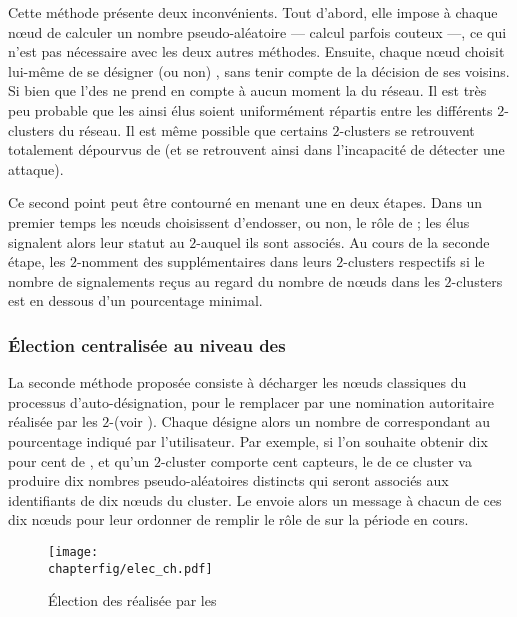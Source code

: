 Cette méthode présente deux inconvénients.
Tout d'abord, elle impose à chaque nœud de calculer un nombre pseudo-aléatoire --- calcul parfois couteux ---, ce qui n'est pas nécessaire avec les deux autres méthodes.
Ensuite, chaque nœud choisit lui-même de se désigner (ou non) \cn, sans tenir compte de la décision de ses voisins.
Si bien que l'\election des \cns ne prend en compte à aucun moment la  du réseau.
Il est très peu probable que les \cns ainsi élus soient uniformément répartis entre les différents $2$-clusters du réseau.
Il est même possible que certains $2$-clusters se retrouvent totalement dépourvus de \cns (et se retrouvent ainsi dans l'incapacité de détecter une attaque).

Ce second point peut être contourné en menant une \election en deux étapes.
Dans un premier temps les nœuds choisissent d'endosser, ou non, le rôle de \cn; les \cns élus signalent alors leur statut au $2$-\CH auquel ils sont associés.
Au cours de la seconde étape, les $2$-\CH nomment des \cns supplémentaires dans leurs $2$-clusters respectifs si le nombre de signalements reçus au regard du nombre de nœuds dans les $2$-clusters est en dessous d'un pourcentage minimal.

        \subsubsection{Élection centralisée au niveau des \chs}
La seconde méthode proposée consiste à décharger les nœuds classiques du processus d'auto-désignation, pour le remplacer par une nomination autoritaire réalisée par les $2$-\chs (voir ).
Chaque \CH désigne alors un nombre de \cns correspondant au pourcentage indiqué par l'utilisateur.
Par exemple, si l'on souhaite obtenir dix pour cent de \cns, et qu'un $2$-cluster comporte cent capteurs, le \CH de ce cluster va produire dix nombres pseudo-aléatoires distincts qui seront associés aux identifiants de dix nœuds du cluster.
Le \CH envoie alors un message à chacun de ces dix nœuds pour leur ordonner de remplir le rôle de \cn sur la période en cours.
\begin{figure}[ht]
    \centering
    \texttt{[image: \\chapterfig/elec\_ch.pdf]}
    \caption{Élection des \cns réalisée par les \chs}\label{sa:fig:elecch}
\end{figure}

